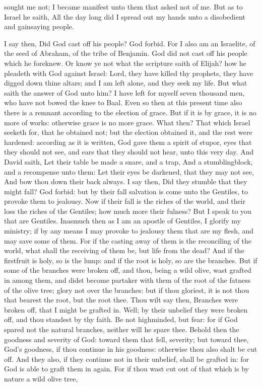 sought me not; I became manifest unto them that asked not of me.  But as to Israel he saith, All the day long did I spread out my hands unto a disobedient and gainsaying people. 

I say then, Did God cast off his people? God forbid. For I also am an Israelite, of the seed of Abraham, of the tribe of Benjamin. God did not cast off his people which he foreknew. Or know ye not what the scripture saith of Elijah? how he pleadeth with God against Israel: Lord, they have killed thy prophets, they have digged down thine altars; and I am left alone, and they seek my life. But what saith the answer of God unto him? I have left for myself seven thousand men, who have not bowed the knee to Baal. Even so then at this present time also there is a remnant according to the election of grace. But if it is by grace, it is no more of works: otherwise grace is no more grace. What then? That which Israel seeketh for, that he obtained not; but the election obtained it, and the rest were hardened: according as it is written, God gave them a spirit of stupor, eyes that they should not see, and ears that they should not hear, unto this very day. And David saith, Let their table be made a snare, and a trap, And a stumblingblock, and a recompense unto them:  Let their eyes be darkened, that they may not see, And bow thou down their back always.  I say then, Did they stumble that they might fall? God forbid: but by their fall salvation is come unto the Gentiles, to provoke them to jealousy. Now if their fall is the riches of the world, and their loss the riches of the Gentiles; how much more their fulness? But I speak to you that are Gentiles. Inasmuch then as I am an apostle of Gentiles, I glorify my ministry; if by any means I may provoke to jealousy them that are my flesh, and may save some of them. For if the casting away of them is the reconciling of the world, what shall the receiving of them be, but life from the dead? And if the firstfruit is holy, so is the lump: and if the root is holy, so are the branches. But if some of the branches were broken off, and thou, being a wild olive, wast grafted in among them, and didst become partaker with them of the root of the fatness of the olive tree; glory not over the branches: but if thou gloriest, it is not thou that bearest the root, but the root thee. Thou wilt say then, Branches were broken off, that I might be grafted in. Well; by their unbelief they were broken off, and thou standest by thy faith. Be not highminded, but fear: for if God spared not the natural branches, neither will he spare thee. Behold then the goodness and severity of God: toward them that fell, severity; but toward thee, God’s goodness, if thou continue in his goodness: otherwise thou also shalt be cut off. And they also, if they continue not in their unbelief, shall be grafted in: for God is able to graft them in again. For if thou wast cut out of that which is by nature a wild olive tree, 